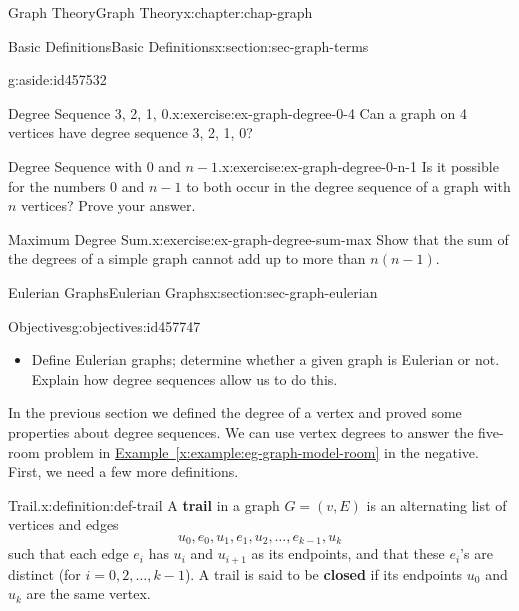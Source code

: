 \documentclass[oneside,10pt,]{book}
\newcommand{\xreffont}{\relax}
\newcommand{\terminology}[1]{\textbf{#1}}
\numberwithin{equation}{section}
\begin{document}
\begin{chapterptx}{Graph Theory}{}{Graph Theory}{}{}{x:chapter:chap-graph}
\begin{sectionptx}{Basic Definitions}{}{Basic Definitions}{}{}{x:section:sec-graph-terms}
\begin{aside}{}{g:aside:id457532}
\end{aside}
\begin{inlineexercise}{Degree Sequence 3, 2, 1, 0.}{x:exercise:ex-graph-degree-0-4}%
Can a graph on 4 vertices have degree sequence 3, 2, 1, 0?%
\end{inlineexercise}
\begin{inlineexercise}{Degree Sequence with 0 and \(n-1\).}{x:exercise:ex-graph-degree-0-n-1}%
Is it possible for the numbers \(0\) and \(n-1\) to both occur in the degree sequence of a graph with \(n\) vertices? Prove your answer.%
\end{inlineexercise}
\begin{inlineexercise}{Maximum Degree Sum.}{x:exercise:ex-graph-degree-sum-max}%
Show that the sum of the degrees of a simple graph cannot add up to more than \(n(n-1)\).%
\end{inlineexercise}
\end{sectionptx}
%
%
\typeout{************************************************}
\typeout{************************************************}
%
\begin{sectionptx}{Eulerian Graphs}{}{Eulerian Graphs}{}{}{x:section:sec-graph-eulerian}
\begin{objectives}{Objectives}{g:objectives:id457747}
%
\begin{itemize}[label=\textbullet]
\item{}Define Eulerian graphs; determine whether a given graph is Eulerian or not. Explain how degree sequences allow us to do this.%
\end{itemize}
\end{objectives}
In the previous section we defined the degree of a vertex and proved some properties about degree sequences. We can use vertex degrees to answer the five-room problem in \hyperref[x:example:eg-graph-model-room]{Example~{\xreffont\ref{x:example:eg-graph-model-room}}} in the negative. First, we need a few more definitions.%
\begin{definition}{Trail.}{x:definition:def-trail}%
A \terminology{trail} in a graph \(G = (v,E)\) is an alternating list of vertices and edges%
\begin{equation*}
u_0,e_0,u_1,e_1,u_2,\ldots,e_{k-1},u_k
\end{equation*}
such that each edge \(e_i\) has \(u_i\) and \(u_{i+1}\) as its endpoints, and that these \(e_i\)'s are distinct (for \(i = 0,2,\ldots,k-1\)). A trail is said to be \terminology{closed} if its endpoints \(u_0\) and \(u_k\) are the same vertex.%

\end{definition}
\end{sectionptx}
\end{chapterptx}
\end{document}
